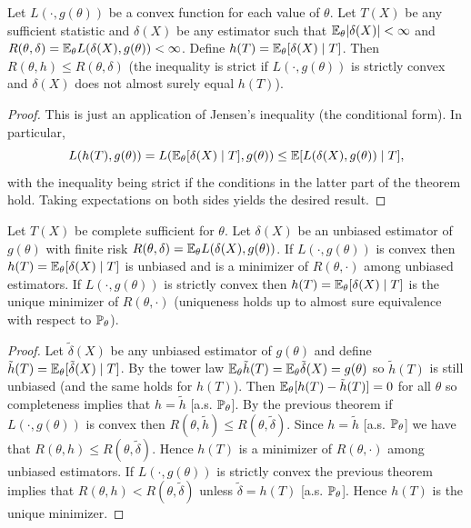 \begin{theorem}
	Let $L(\cdot, g(\theta))$ be a convex function for each value of $\theta$. Let $T(X)$ be any sufficient statistic and $\delta(X)$ be any estimator such that $\mathbb{E}_\theta |\delta(X)| < \infty$ and $R(\theta, \delta) = \mathbb{E}_\theta L(\delta(X), g(\theta)) < \infty$. Define $h(T) = \mathbb{E}_\theta[\delta(X) \mid T]$. Then $R(\theta, h) \le R(\theta, \delta)$ (the inequality is strict if $L(\cdot, g(\theta))$ is strictly convex and $\delta(X)$ does not almost surely equal $h(T)$).
\end{theorem}

\begin{proof}
	This is just an application of Jensen's inequality (the conditional form). In particular, \[
		L(h(T), g(\theta)) = L(\mathbb{E}_\theta[\delta(X) \mid T], g(\theta)) \le \mathbb{E}[L(\delta(X), g(\theta)) \mid T],
	\] with the inequality being strict if the conditions in the latter part of the theorem hold. Taking expectations on both sides yields the desired result.
\end{proof}

\begin{theorem}
	Let $T(X)$ be complete sufficient for $\theta$. Let $\delta(X)$ be an unbiased estimator of $g(\theta)$ with finite risk $R(\theta, \delta) = \mathbb{E}_\theta L(\delta(X), g(\theta))$. If $L(\cdot, g(\theta))$ is convex then $h(T) = \mathbb{E}_\theta[\delta(X) \mid T]$ is unbiased and is a minimizer of $R(\theta, \cdot)$ among unbiased estimators. If $L(\cdot, g(\theta))$ is strictly convex then $h(T) = \mathbb{E}_\theta[\delta(X) \mid T]$ is the unique minimizer of $R(\theta, \cdot)$  (uniqueness holds up to almost sure equivalence with respect to $\mathbb{P}_\theta$). 
\end{theorem}

\begin{proof}
	 Let $\tilde{\delta}(X)$ be any unbiased estimator of $g(\theta)$ and define $\tilde{h}(T) = \mathbb{E}_\theta[\tilde{\delta}(X) \mid T]$. By the tower law $\mathbb{E}_\theta \tilde{h}(T) = \mathbb{E}_\theta \tilde{\delta}(X) = g(\theta)$ so $\tilde{h}(T)$ is still unbiased (and the same holds for $h(T)$). Then $\mathbb{E}_\theta[h(T) - \tilde{h}(T)] = 0$ for all $\theta$ so completeness implies that $h = \tilde{h}$ [a.s. $\mathbb{P}_\theta$]. By the previous theorem if $L(\cdot, g(\theta))$ is convex then $R(\theta, \tilde{h}) \le R(\theta, \tilde{\delta})$. Since $h = \tilde{h}$ [a.s. $\mathbb{P}_\theta$] we have that $R(\theta, h) \le R(\theta, \tilde{\delta})$. Hence $h(T)$ is a minimizer of $R(\theta, \cdot)$ among unbiased estimators. If $L(\cdot, g(\theta))$ is strictly convex the previous theorem implies that $R(\theta, h) < R(\theta, \tilde{\delta})$ unless $\tilde{\delta} = h(T)$ [a.s.  $\mathbb{P}_\theta$]. Hence $h(T)$ is the unique minimizer.
\end{proof}

